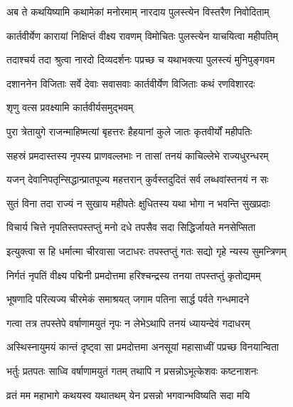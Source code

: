 \twolineshloka
{अब ते कथयिष्यामि कथामेकां मनोरमाम्}
{नारदाय पुलस्त्येन विस्तरैण निवोदिताम्} %

\twolineshloka
{कार्तवीर्येण कारायां निक्षिप्तं वीक्ष्य रावणम्}
{विमोचितः पुलस्त्येन याचयित्वा महीपतिम्} %

\twolineshloka
{तदाश्चर्य तदा श्रुत्वा नारदो दिव्यदर्शनः}
{पप्रच्छ च यथाभक्त्या पुलस्त्यं मुनिपुङ्गवम} %


\twolineshloka
{दशाननेन विजिताः सर्वे देवाः सवासवाः}
{कार्तवीर्येण विजिताः कथं रणविशारदः} %



\onelineshloka
{शृणु वत्स प्रवक्ष्यामि कार्तवीर्यसमुद्भवम्} %

\twolineshloka
{पुरा त्रेतायुगे राजन्माहिष्मत्यां बृहत्तरः}
{हैहयानां कुले जातः कृतवीर्यों महीपतिः} %

\twolineshloka
{सहस्रं प्रमदास्तस्य नृपस्य प्राणवल्लभाः}
{न तासां तनयं काचिल्लेभे राज्यधुरन्धरम्} %

\twolineshloka
{यजन् देवानिपतृन्सिद्धान्प्रातपूज्य महत्तरान्}
{कुर्वस्तदुदितं सर्व लब्धवांस्तनयं न सः} %

\twolineshloka
{सुतं विना तदा राज्यं न सुखाय महीपतेः}
{क्षुधितस्य यथा भोगा न भवन्ति सुखप्रदाः} %

\twolineshloka
{विचार्य चित्ते नृपतिस्तपस्तप्तुं मनो दधे}
{तपसैव सदा सिद्धिर्जायते मनसेप्सिता} %

\twolineshloka
{इत्युक्त्वा स हि धर्मात्मा चीरवासा जटाधरः}
{तपस्तप्तुं गतः सद्यो गृहे न्यस्य सुमन्त्रिणम्} %

\twolineshloka
{निर्गतं नृपतिं वीक्ष्य पद्मिनी प्रमदोत्तमा}
{हरिश्चन्द्रस्य तनया तपस्तप्तुं कृतोद्यमम्} %

\twolineshloka
{भूषणादि परित्यज्य चीरमेकं समाश्रयत्}
{जगाम पतिना सार्द्ध पर्वते गन्धमादने} %

\twolineshloka
{गत्वा तत्र तपस्तेपे वर्षाणामयुतं नृपः}
{न लेभेऽथापि तनयं ध्यायन्देवं गदाधरम्} %

\twolineshloka
{अस्थिस्नायुमयं कान्तं दृष्ट्वा सा प्रमदोत्तमा}
{अनसूयां महासाध्वीं पप्रच्छ विनयान्विता} %

\twolineshloka
{भर्तुः प्रतपतः साध्वि वर्षाणामयुतं गतम्}
{तथापि न प्रसन्नोऽभूत्केशवः कष्टनाशनः} %

\twolineshloka
{व्रतं मम महाभागे कथयस्व यथातथम्}
{येन प्रसन्नो भगवान्भविष्यति सदा मयि} %


